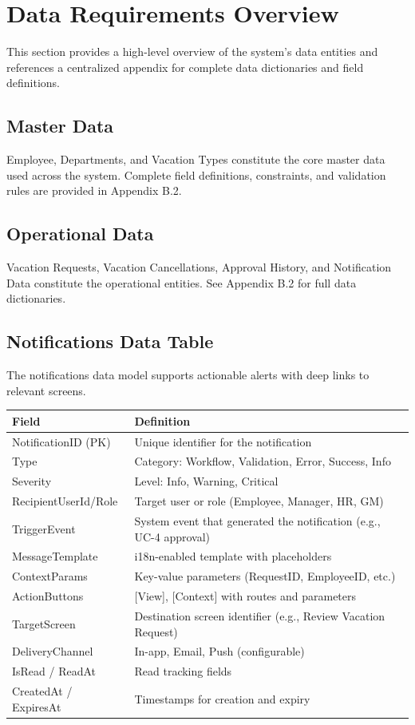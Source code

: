 \documentclass[12pt,a4paper]{article}
\begin{document}
\section{Data Requirements Overview}

This section provides a high-level overview of the system's data entities and references a centralized appendix for complete data dictionaries and field definitions.

\subsection{Master Data}
Employee, Departments, and Vacation Types constitute the core master data used across the system. Complete field definitions, constraints, and validation rules are provided in Appendix B.2.

\subsection{Operational Data}
Vacation Requests, Vacation Cancellations, Approval History, and Notification Data constitute the operational entities. See Appendix B.2 for full data dictionaries.

\subsection{Notifications Data Table}
The notifications data model supports actionable alerts with deep links to relevant screens.

\begin{longtable}{p{4cm} p{11cm}}
\toprule
\textbf{Field} & \textbf{Definition} \\
\midrule
NotificationID (PK) & Unique identifier for the notification \\
Type & Category: Workflow, Validation, Error, Success, Info \\
Severity & Level: Info, Warning, Critical \\
RecipientUserId/Role & Target user or role (Employee, Manager, HR, GM) \\
TriggerEvent & System event that generated the notification (e.g., UC-4 approval) \\
MessageTemplate & i18n-enabled template with placeholders \\
ContextParams & Key-value parameters (RequestID, EmployeeID, etc.) \\
ActionButtons & [View], [Context] with routes and parameters \\
TargetScreen & Destination screen identifier (e.g., Review Vacation Request) \\
DeliveryChannel & In-app, Email, Push (configurable) \\
IsRead / ReadAt & Read tracking fields \\
CreatedAt / ExpiresAt & Timestamps for creation and expiry \\
\bottomrule
\end{longtable}
\end{document}
